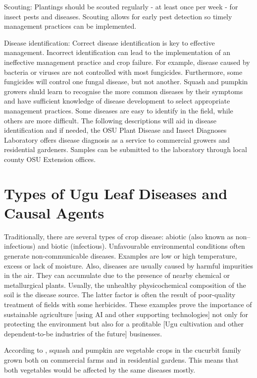 Scouting: Plantings should be scouted regularly - at least once per week - for insect pests and diseases. Scouting allows for early pest detection so timely management practices can be implemented. \citep{johnPumpkinSquashDiseases2019a}

Disease identification: Correct disease identification is key to effective management. Incorrect identification can lead to the implementation of an ineffective management practice and crop failure. For example, disease caused by bacteria or viruses are not controlled with most fungicides. Furthermore, some fungicides will control one fungal disease, but not another. Squash and pumpkin growers shuld learn to recognise the more common diseases by their symptoms and have sufficient knowledge of disease development to select appropriate management practices. Some diseases are easy to identify in the field, while others are more difficult. The following descriptions will aid in disease identification and if needed, the OSU Plant Disease and Insect Diagnoses Laboratory offers disease diagnosis as a service to commercial growers and residential gardeners. Samples can be submitted to the laboratory through local county OSU Extension offices.  \citep{johnPumpkinSquashDiseases2019a}

\section{Types of Ugu Leaf Diseases and Causal Agents}
Traditionally, there are several types of crop disease: abiotic (also known as non--infectious) and biotic (infectious). Unfavourable environmental conditions often generate non-communicable diseases. Examples are low or high temperature, excess or lack of moisture. Also, diseases are usually caused by harmful impurities in the air. They can accumulate due to the presence of nearby chemical or metallurgical plants. Usually, the unhealthy physicochemical composition of the soil is the disease source. The latter factor is often the result of poor-quality treatment of fields with some herbicides. These examples prove the importance of sustainable agriculture [using AI and other supporting technologies] not only for protecting the environment but also for a profitable [Ugu cultivation and other dependent-to-be industries of the future] businesses. \citep{vasylCropDiseasesHow2023}

According to \citep{johnPumpkinSquashDiseases2019a}, squash and pumpkin are vegetable crops in the cucurbit family grown both on commercial farms and in residential gardens. This means that both vegetables would be affected by the same diseases mostly. 

